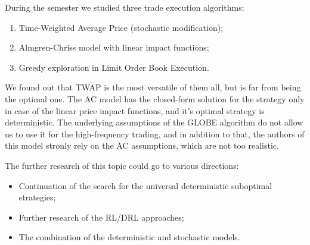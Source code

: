 \conclusion %
    During the semester we studied three trade execution algorithms:
    \begin{enumerate}
        \item Time-Weighted Average Price (stochastic modification);
        \item Almgren-Chriss model with linear impact functions;
        \item Greedy exploration in Limit Order Book Execution.
    \end{enumerate}
    We found out that TWAP is the most versatile of them all, but is far from being the optimal one. 
    The AC model has the closed-form solution for the strategy only in case of the 
    linear price impact functions, and it's optimal strategy is deterministic.
    The underlying assumptions of the GLOBE algorithm do not allow us to use it for the high-frequency trading, and in 
    addition to that, the authors of this model stronly rely on the AC assumptions, which are not too realistic. 

    The further research of this topic could go to various directions:
    \begin{itemize}
        \item Continuation of the search for the universal deterministic suboptimal strategies;
        \item Further research of the RL/DRL approaches;
        \item The combination of the deterministic and stochastic models.
    \end{itemize}